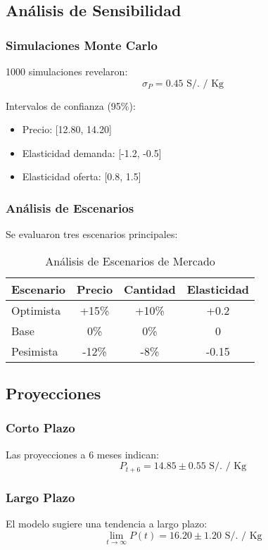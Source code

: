 \documentclass[12pt, a4paper]{article}
\begin{document}
\subsection{Análisis de Sensibilidad}
\subsubsection{Simulaciones Monte Carlo}
1000 simulaciones revelaron:
\begin{equation}
    \sigma_P = 0.45 \text{ S/. / Kg}
\end{equation}

Intervalos de confianza (95\%):
\begin{itemize}
    \item Precio: [12.80, 14.20]
    \item Elasticidad demanda: [-1.2, -0.5]
    \item Elasticidad oferta: [0.8, 1.5]
\end{itemize}

\subsubsection{Análisis de Escenarios}
Se evaluaron tres escenarios principales:

\begin{table}[h]
\centering
\begin{tabular}{lccc}
\toprule
Escenario & Precio & Cantidad & Elasticidad \\
\midrule
Optimista & +15\% & +10\% & +0.2 \\
Base & 0\% & 0\% & 0 \\
Pesimista & -12\% & -8\% & -0.15 \\
\bottomrule
\end{tabular}
\caption{Análisis de Escenarios de Mercado}
\end{table}

\subsection{Proyecciones}
\subsubsection{Corto Plazo}
Las proyecciones a 6 meses indican:
\begin{equation}
    P_{t+6} = 14.85 \pm 0.55 \text{ S/. / Kg}
\end{equation}

\subsubsection{Largo Plazo}
El modelo sugiere una tendencia a largo plazo:
\begin{equation}
    \lim_{t \to \infty} P(t) = 16.20 \pm 1.20 \text{ S/. / Kg}
\end{equation}
\end{document}
